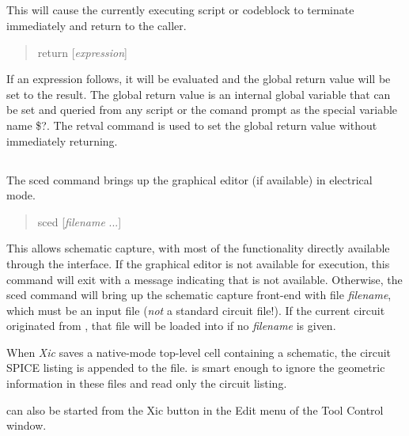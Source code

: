 \subsection{}


This will cause the currently executing script or codeblock to
terminate immediately and return to the caller.
\begin{quote}\vt
return [{\it expression\/}]
\end{quote}
If an expression follows, it will be evaluated and the global return
value will be set to the result.  The global return value is an
internal global variable that can be set and queried from any script
or the comand prompt as the special variable name {\vt \$?}.  The {\cb
retval} command is used to set the global return value without
immediately returning.


\subsection{}


The {\cb sced} command brings up the {\Xic} graphical editor (if
available) in electrical mode.
\begin{quote}\vt
sced [{\it filename} ...]
\end{quote}
This allows schematic capture, with most of the {\WRspice}
functionality directly available through the {\Xic} interface.  If the
{\Xic} graphical editor is not available for execution, this command
will exit with a message indicating that {\Xic} is not available. 
Otherwise, the {\cb sced} command will bring up the schematic capture
front-end with file {\it filename\/}, which must be an {\Xic} input
file ({\it not} a standard {\WRspice} circuit file!).  If the current
circuit originated from {\Xic}, that file will be loaded into {\Xic}
if no {\it filename} is given. 

When {\it Xic} saves a native-mode top-level cell containing a
schematic, the circuit SPICE listing is appended to the file. 
{\WRspice} is smart enough to ignore the geometric information in
these files and read only the circuit listing.

{\Xic} can also be started from the {\cb Xic} button in the {\cb Edit}
menu of the {\cb Tool Control} window.

